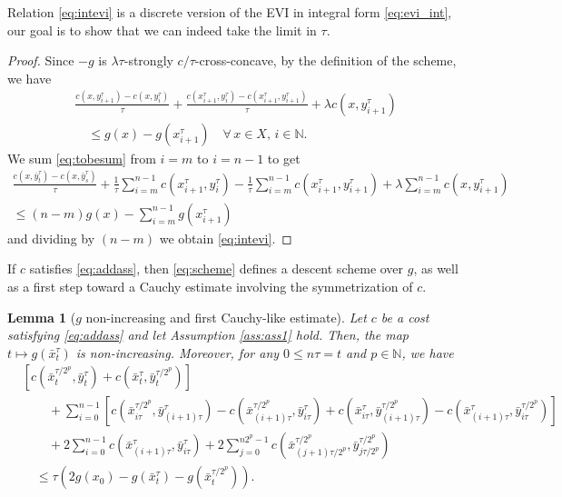 \documentclass[reqno]{amsart}
\newcounter{results}[section]
\theoremstyle{plain}
\newtheorem{lemma}[results]{Lemma}
\theoremstyle{remark}
\theoremstyle{plain}
\numberwithin{equation}{section}
\theoremstyle{remark}
\newcommand{\N}{\mathbb{N}}
\begin{document}
 Relation  \eqref{eq:intevi} is a discrete version of  the EVI in integral form  \eqref{eq:evi_int}, our goal is to show that we can indeed take the limit in $\tau$.

\begin{proof} Since $-g$ is $\lambda \tau$-strongly $c/\tau$-cross-concave, by the definition of the scheme, we have
\begin{align}
\frac{c(x,y_{i+1}^\tau)- c(x,y_i^\tau)}{\tau} + \frac{c(x_{i+1}^\tau, y_i^\tau)-c(x_{i+1}^\tau, y_{i+1}^\tau)}{\tau} + \lambda c(x,y_{i+1}^\tau) \nonumber\\
\quad \le g(x)-g(x_{i+1}^\tau) \quad \forall \, x \in X, \, i \in  \N .\label{eq:tobesum}
\end{align}
We sum \eqref{eq:tobesum} from $i=m$ to $i=n-1$ to get
\begin{multline}
    \frac{c(x,\bar{y}_t^\tau)-c(x,\bar{y}_s^\tau)}{\tau} + \frac{1}{\tau} \sum_{i=m}^{n-1}c(x_{i+1}^\tau, y_i^\tau) - \frac{1}{\tau} \sum_{i=m}^{n-1} c(x^\tau_{i+1},y^\tau_{i+1}) +\lambda \sum_{i=m}^{n-1}c(x,y_{i+1}^\tau) \\
    \le (n-m)g(x) - \sum_{i=m}^{n-1} g(x_{i+1}^\tau) \label{eq:poi}
\end{multline}
and dividing by $(n-m)$ we obtain \eqref{eq:intevi}.
\end{proof}

 If $c$ satisfies \eqref{eq:addass}, then  \eqref{eq:scheme} defines a descent scheme over $g$, as well as  a first step toward a Cauchy estimate involving the symmetrization of $c$.
\begin{lemma}[$g$ non-increasing and first Cauchy-like estimate]\label{lem:non-increasing}  Let $c$ be a cost satisfying \eqref{eq:addass}  and let  Assumption \ref{ass:ass1} hold. Then,   the map $t \mapsto g(\bar{x}^\tau_t)$ is non-increasing. Moreover, for any $0 \le n\tau=t$ and $p \in \N$, we have
    \begin{align}
&[c(\bar{x}_{t}^{\tau/2^p},\bar{y}_{t}^\tau)+c(\bar{x}_{t}^\tau,\bar{y}_{t}^{\tau/2^p})]\nonumber\\
 &  \qquad +\sum_{i=0}^{n-1}[c(\bar{x}_{i\tau}^{\tau/2^p},\bar{y}_{(i+1)\tau}^\tau)- c(\bar{x}_{(i+1)\tau}^{\tau/2^p},\bar{y}_{i\tau}^\tau) + c(\bar{x}_{i\tau}^\tau,\bar{y}_{(i+1)\tau}^{\tau/2^p})-c(\bar{x}_{(i+1)\tau}^\tau,\bar{y}_{i\tau}^{\tau/2^p})]\nonumber\\ 
 & \qquad  +2\sum_{i=0}^{n-1}c(\bar{x}_{(i+1)\tau}^\tau, \bar{y}_{i\tau}^\tau)+ 2\sum_{j=0}^{n2^p-1}c(\bar{x}_{(j+1)\tau/2^p}^{\tau/2^p}, \bar{y}_{j\tau/2^p}^{\tau/2^p})\nonumber\\
    & \quad \le \tau(2g(x_0)-g(\bar{x}_{t}^\tau)-g(\bar{x}_{t}^{\tau/2^p})).\label{eq:Cauchy_ineq_full}
\end{align}
\end{lemma}
\end{document}
